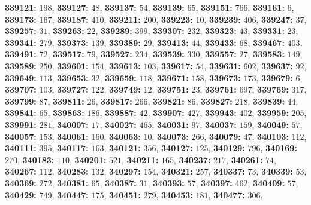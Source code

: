 \textsf{\bfseries 339121:} $198$, \textsf{\bfseries 339127:} $48$, \textsf{\bfseries 339137:} $54$, \textsf{\bfseries 339139:} $65$, \textsf{\bfseries 339151:} $766$, \textsf{\bfseries 339161:} $6$, \textsf{\bfseries 339173:} $167$, \textsf{\bfseries 339187:} $410$, \textsf{\bfseries 339211:} $200$, \textsf{\bfseries 339223:} $10$, \textsf{\bfseries 339239:} $406$, \textsf{\bfseries 339247:} $37$, \textsf{\bfseries 339257:} $31$, \textsf{\bfseries 339263:} $22$, \textsf{\bfseries 339289:} $399$, \textsf{\bfseries 339307:} $232$, \textsf{\bfseries 339323:} $43$, \textsf{\bfseries 339331:} $23$, \textsf{\bfseries 339341:} $279$, \textsf{\bfseries 339373:} $139$, \textsf{\bfseries 339389:} $29$, \textsf{\bfseries 339413:} $44$, \textsf{\bfseries 339433:} $68$, \textsf{\bfseries 339467:} $403$, \textsf{\bfseries 339491:} $72$, \textsf{\bfseries 339517:} $79$, \textsf{\bfseries 339527:} $234$, \textsf{\bfseries 339539:} $330$, \textsf{\bfseries 339557:} $27$, \textsf{\bfseries 339583:} $149$, \textsf{\bfseries 339589:} $250$, \textsf{\bfseries 339601:} $154$, \textsf{\bfseries 339613:} $103$, \textsf{\bfseries 339617:} $54$, \textsf{\bfseries 339631:} $602$, \textsf{\bfseries 339637:} $92$, \textsf{\bfseries 339649:} $113$, \textsf{\bfseries 339653:} $32$, \textsf{\bfseries 339659:} $118$, \textsf{\bfseries 339671:} $158$, \textsf{\bfseries 339673:} $173$, \textsf{\bfseries 339679:} $6$, \textsf{\bfseries 339707:} $103$, \textsf{\bfseries 339727:} $122$, \textsf{\bfseries 339749:} $12$, \textsf{\bfseries 339751:} $23$, \textsf{\bfseries 339761:} $697$, \textsf{\bfseries 339769:} $317$, \textsf{\bfseries 339799:} $87$, \textsf{\bfseries 339811:} $26$, \textsf{\bfseries 339817:} $266$, \textsf{\bfseries 339821:} $86$, \textsf{\bfseries 339827:} $218$, \textsf{\bfseries 339839:} $44$, \textsf{\bfseries 339841:} $65$, \textsf{\bfseries 339863:} $186$, \textsf{\bfseries 339887:} $42$, \textsf{\bfseries 339907:} $427$, \textsf{\bfseries 339943:} $402$, \textsf{\bfseries 339959:} $205$, \textsf{\bfseries 339991:} $281$, \textsf{\bfseries 340007:} $17$, \textsf{\bfseries 340027:} $465$, \textsf{\bfseries 340031:} $97$, \textsf{\bfseries 340037:} $159$, \textsf{\bfseries 340049:} $57$, \textsf{\bfseries 340057:} $153$, \textsf{\bfseries 340061:} $160$, \textsf{\bfseries 340063:} $10$, \textsf{\bfseries 340073:} $266$, \textsf{\bfseries 340079:} $47$, \textsf{\bfseries 340103:} $112$, \textsf{\bfseries 340111:} $395$, \textsf{\bfseries 340117:} $163$, \textsf{\bfseries 340121:} $356$, \textsf{\bfseries 340127:} $125$, \textsf{\bfseries 340129:} $796$, \textsf{\bfseries 340169:} $270$, \textsf{\bfseries 340183:} $110$, \textsf{\bfseries 340201:} $521$, \textsf{\bfseries 340211:} $165$, \textsf{\bfseries 340237:} $217$, \textsf{\bfseries 340261:} $74$, \textsf{\bfseries 340267:} $112$, \textsf{\bfseries 340283:} $132$, \textsf{\bfseries 340297:} $154$, \textsf{\bfseries 340321:} $257$, \textsf{\bfseries 340337:} $73$, \textsf{\bfseries 340339:} $53$, \textsf{\bfseries 340369:} $272$, \textsf{\bfseries 340381:} $65$, \textsf{\bfseries 340387:} $31$, \textsf{\bfseries 340393:} $57$, \textsf{\bfseries 340397:} $462$, \textsf{\bfseries 340409:} $57$, \textsf{\bfseries 340429:} $749$, \textsf{\bfseries 340447:} $175$, \textsf{\bfseries 340451:} $279$, \textsf{\bfseries 340453:} $181$, \textsf{\bfseries 340477:} $306$, 
